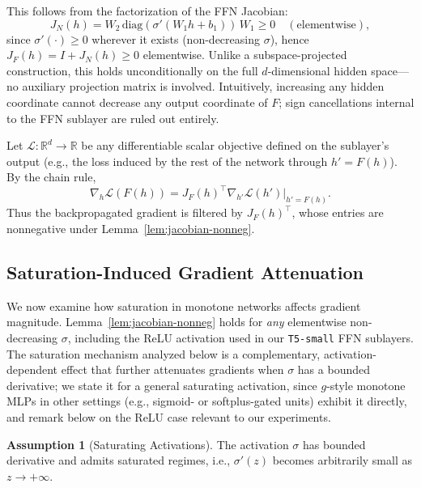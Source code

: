 \documentclass{article}
\theoremstyle{plain}
\theoremstyle{definition}
\newtheorem{assumption}[theorem]{Assumption}
\theoremstyle{remark}
\begin{document}
This follows from the factorization of the FFN Jacobian:
\[
J_N(h)=W_2\,\mathrm{diag}(\sigma'(W_1 h+b_1))\,W_1 \ge 0 \quad (\text{elementwise}),
\]
since $\sigma'(\cdot) \ge 0$ wherever it exists (non-decreasing $\sigma$), hence
$J_F(h)=I + J_N(h)\ge 0$ elementwise. Unlike a subspace-projected construction,
this holds unconditionally on the full $d$-dimensional hidden space—no auxiliary
projection matrix is involved. Intuitively, increasing any hidden coordinate
cannot decrease any output coordinate of $F$; sign cancellations internal to the
FFN sublayer are ruled out entirely.

Let $\mathcal{L}:\mathbb{R}^d\to\mathbb{R}$ be any differentiable scalar objective
defined on the sublayer's output (e.g., the loss induced by the rest of the
network through $h'=F(h)$). By the chain rule,
\[
\nabla_h \mathcal{L}(F(h)) = J_F(h)^\top \nabla_{h'} \mathcal{L}(h')\big|_{h'=F(h)}.
\]
Thus the backpropagated gradient is filtered by $J_F(h)^\top$, whose entries are
nonnegative under Lemma~\ref{lem:jacobian-nonneg}.


\subsection{Saturation-Induced Gradient Attenuation}
We now examine how saturation in monotone networks affects gradient magnitude.
Lemma~\ref{lem:jacobian-nonneg} holds for \emph{any} elementwise non-decreasing
$\sigma$, including the ReLU activation used in our \texttt{T5-small} FFN
sublayers. The saturation mechanism analyzed below is a complementary,
activation-dependent effect that further attenuates gradients when $\sigma$
has a bounded derivative; we state it for a general saturating activation, since
$g$-style monotone MLPs in other settings (e.g., sigmoid- or softplus-gated
units) exhibit it directly, and remark below on the ReLU case relevant to our
experiments.
\begin{assumption}[Saturating Activations]
\label{ass:saturation}
The activation $\sigma$ has bounded derivative and admits saturated
regimes, i.e., $\sigma'(z)$ becomes arbitrarily small as $z\to +\infty$.
\end{assumption}


\end{document}
